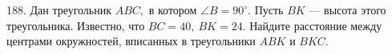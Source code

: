 188. Дан треугольник $ABC,$ в котором $\angle B=90^\circ.$ Пусть $BK$ --- высота этого треугольника. Известно, что $BC=40,\ BK=24.$ Найдите расстояние между центрами окружностей, вписанных в треугольники $ABK$ и $BKC.$\\
